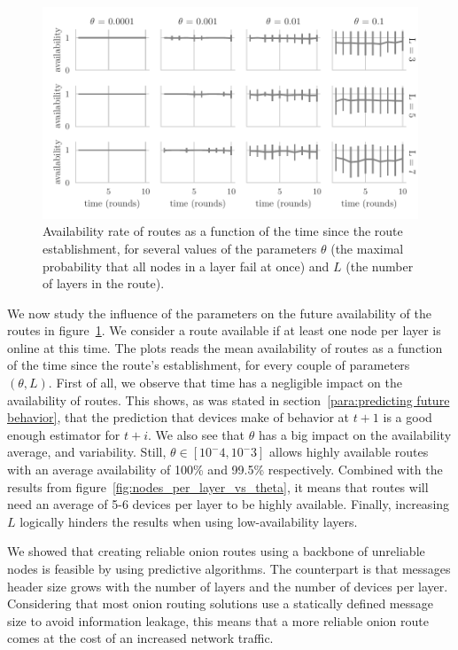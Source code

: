 \begin{figure}[t]
\includegraphics[width=\columnwidth]{figures/success_rate_vs_t.pdf}
\caption{\label{fig:success_rate_vs_t}Availability rate of routes as a function of the time since the route establishment, for several values of the parameters $\theta$ (the maximal probability that all nodes in a layer fail at once) and $L$ (the number of layers in the route).}
\end{figure}

We now study the influence of the parameters on the future availability of the routes in figure~\ref{fig:success_rate_vs_t}.
We consider a route available if at least one node per layer is online at this time.
The plots reads the mean availability of routes as a function of the time since the route's establishment, for every couple of parameters $(\theta, L)$.
First of all, we observe that time has a negligible impact on the availability of routes. 
This shows, as was stated in section~\ref{para:predicting future behavior}, that the prediction that devices make of behavior at $t+1$ is a good enough estimator for $t+i$.
We also see that $\theta$ has a big impact on the availability average, and variability.
Still, $\theta\in[10^-4, 10^-3]$ allows highly available routes with an average availability of 100\% and 99.5\% respectively.
Combined with the results from figure~\ref{fig:nodes_per_layer_vs_theta}, it means that routes will need an average of 5-6 devices per layer to be highly available.
Finally, increasing $L$ logically hinders the results when using low-availability layers.

We showed that creating reliable onion routes using a backbone of unreliable nodes is feasible by using predictive algorithms.
The counterpart is that messages header size grows  with the number of layers and the number of devices per layer.
Considering that most onion routing solutions use a statically defined message size to avoid information leakage, this means that a more reliable onion route comes at the cost of an increased network traffic.



